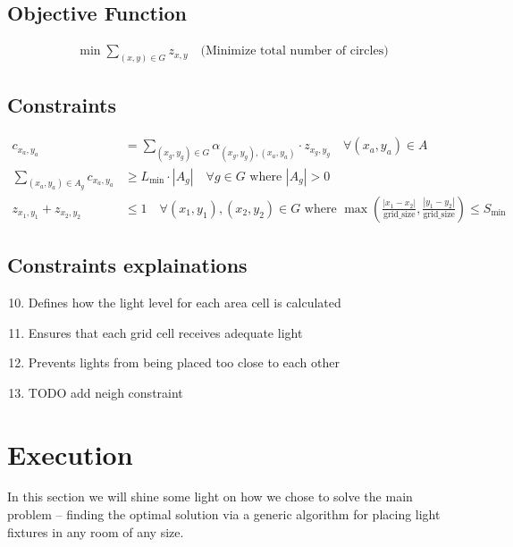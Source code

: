 \documentclass{article}
\begin{document}
\subsection{Objective Function}
\begin{align}
    \min \sum_{(x, y) \in G} z_{x, y} \quad \text{(Minimize total number of circles)}
\end{align}

\subsection{Constraints}
\begin{align}
    c_{x_a, y_a} &= \sum_{(x_g, y_g) \in G} \alpha_{(x_g, y_g), (x_a, y_a)} \cdot z_{x_g, y_g} \quad \forall (x_a, y_a) \in A\\
    \sum_{(x_a, y_a) \in A_g} c_{x_a, y_a} &\geq L_{\min} \cdot |A_g| \quad \forall g \in G \text{ where } |A_g| > 0\\
    z_{x_1, y_1} + z_{x_2, y_2} &\leq 1 \quad \forall (x_1,y_1),(x_2,y_2) \in G \text{ where } \max\left(\frac{|x_1-x_2|}{\text{grid\_size}}, \frac{|y_1-y_2|}{\text{grid\_size}}\right) \leq S_{\min}
\end{align}

\subsection{Constraints explainations}

\begin{enumerate}
    \setcounter{enumi}{9}
    \item Defines how the light level for each area cell is calculated
    \item Ensures that each grid cell receives adequate light
    \item Prevents lights from being placed too close to each other
    \item TODO add neigh constraint 
\end{enumerate}

\newpage

\section{Execution}

In this section we will shine some light on how we chose to solve the main problem – finding the optimal solution via a generic algorithm 
for placing light fixtures in any room of any size.
\end{document}
